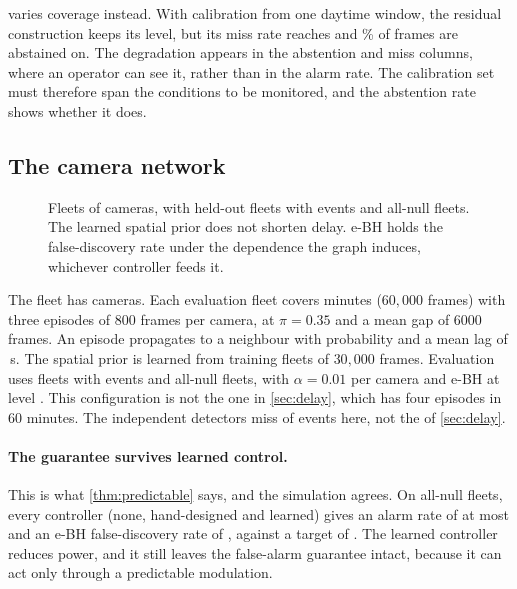  varies coverage instead. With calibration from one daytime
window, the residual construction keeps its level, but its miss rate reaches
\CoverDaytimeMiss{} and \CoverDaytimeAbstain\% of frames are abstained on. The
degradation appears in the abstention and miss columns, where an operator can see
it, rather than in the alarm rate. The calibration set must therefore span the
conditions to be monitored, and the abstention rate shows whether it does.


\subsection{The camera network}
\label{sec:network}

\begin{figure}[t]
  \centering
  \caption{Fleets of \NetCameras{} cameras, with \NetFleets{} held-out fleets with
  events and \NetFleets{} all-null fleets. The learned spatial prior does not
  shorten delay. e-BH holds the false-discovery rate under the dependence the
  graph induces, whichever controller feeds it.}
  \label{fig:network}
\end{figure}


The fleet has \NetCameras{} cameras. Each evaluation fleet covers \NetEvalMinutes{}
minutes ($60{,}000$ frames) with three episodes of 800 frames per camera, at
$\pi=0.35$ and a mean gap of $6000$ frames. An episode propagates to a neighbour
with probability \NetPropProb{} and a mean lag of \NetPropLagSec{}\,s. The spatial
prior is learned from \NetTrainFleets{} training fleets of $30{,}000$ frames.
Evaluation uses \NetFleets{} fleets with events and \NetFleets{} all-null fleets,
with $\alpha=0.01$ per camera and e-BH at level \NetFdrLevel{}. This configuration
is not the one in \cref{sec:delay}, which has four episodes in 60 minutes. The
independent detectors miss \NetNoGraphMiss{} of events here, not the
\DelaySentinelMiss{} of \cref{sec:delay}.

\paragraph{The guarantee survives learned control.}
This is what \cref{thm:predictable} says, and the simulation agrees. On all-null
fleets, every controller (none, hand-designed and learned) gives an alarm rate of
at most \NetGnnNullPfa{} and an e-BH false-discovery rate of \NetGnnFdr{}, against
a target of \NetFdrLevel{}. The learned controller reduces power, and it still
leaves the false-alarm guarantee intact, because it can act only through a
predictable modulation.

